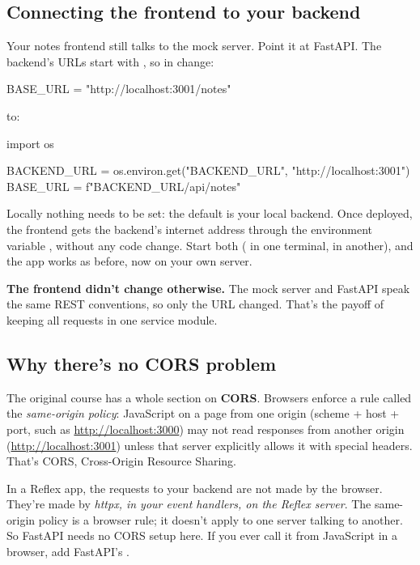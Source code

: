 \subsection{Connecting the frontend to your backend}

Your notes frontend still talks to the mock server. Point it at FastAPI. The backend's URLs start with , so in  change:

\begin{py}
BASE_URL = "http://localhost:3001/notes"
\end{py}

to:

\begin{py}
import os

BACKEND_URL = os.environ.get("BACKEND_URL", "http://localhost:3001")
BASE_URL = f"{BACKEND_URL}/api/notes"
\end{py}

Locally nothing needs to be set: the default is your local backend. Once deployed, the frontend gets the backend's internet address through the environment variable , without any code change. Start both ( in one terminal,  in another), and the app works as before, now on your own server.

\textbf{The frontend didn't change otherwise.} The mock server and FastAPI speak the same REST conventions, so only the URL changed. That's the payoff of keeping all requests in one service module.

\subsection{Why there's no CORS problem}

The original course has a whole section on \textbf{CORS}. Browsers enforce a rule called the \emph{same-origin policy}: JavaScript on a page from one origin (scheme + host + port, such as \url{http://localhost:3000}) may not read responses from another origin (\url{http://localhost:3001}) unless that server explicitly allows it with special headers. That's CORS, Cross-Origin Resource Sharing.

In a Reflex app, the requests to your backend are not made by the browser. They're made by \emph{httpx, in your event handlers, on the Reflex server}. The same-origin policy is a browser rule; it doesn't apply to one server talking to another. So FastAPI needs no CORS setup here. If you ever call it from JavaScript in a browser, add FastAPI's .

